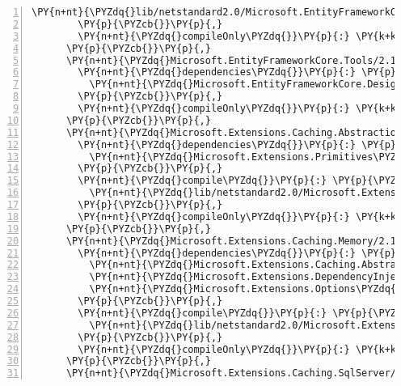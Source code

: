 \begin{Verbatim}[commandchars=\\\{\},numbers=left,firstnumber=1,stepnumber=1,numberblanklines=0]
          \PY{n+nt}{\PYZdq{}lib/netstandard2.0/Microsoft.EntityFrameworkCore.SqlServer.dll\PYZdq{}}\PY{p}{:} \PY{p}{\PYZob{}}\PY{p}{\PYZcb{}}
        \PY{p}{\PYZcb{}}\PY{p}{,}
        \PY{n+nt}{\PYZdq{}compileOnly\PYZdq{}}\PY{p}{:} \PY{k+kc}{true}
      \PY{p}{\PYZcb{}}\PY{p}{,}
      \PY{n+nt}{\PYZdq{}Microsoft.EntityFrameworkCore.Tools/2.1.0\PYZhy{}rc1\PYZhy{}final\PYZdq{}}\PY{p}{:} \PY{p}{\PYZob{}}
        \PY{n+nt}{\PYZdq{}dependencies\PYZdq{}}\PY{p}{:} \PY{p}{\PYZob{}}
          \PY{n+nt}{\PYZdq{}Microsoft.EntityFrameworkCore.Design\PYZdq{}}\PY{p}{:} \PY{l+s+s2}{\PYZdq{}2.1.0\PYZhy{}rc1\PYZhy{}final\PYZdq{}}
        \PY{p}{\PYZcb{}}\PY{p}{,}
        \PY{n+nt}{\PYZdq{}compileOnly\PYZdq{}}\PY{p}{:} \PY{k+kc}{true}
      \PY{p}{\PYZcb{}}\PY{p}{,}
      \PY{n+nt}{\PYZdq{}Microsoft.Extensions.Caching.Abstractions/2.1.0\PYZhy{}rc1\PYZhy{}final\PYZdq{}}\PY{p}{:} \PY{p}{\PYZob{}}
        \PY{n+nt}{\PYZdq{}dependencies\PYZdq{}}\PY{p}{:} \PY{p}{\PYZob{}}
          \PY{n+nt}{\PYZdq{}Microsoft.Extensions.Primitives\PYZdq{}}\PY{p}{:} \PY{l+s+s2}{\PYZdq{}2.1.0\PYZhy{}rc1\PYZhy{}final\PYZdq{}}
        \PY{p}{\PYZcb{}}\PY{p}{,}
        \PY{n+nt}{\PYZdq{}compile\PYZdq{}}\PY{p}{:} \PY{p}{\PYZob{}}
          \PY{n+nt}{\PYZdq{}lib/netstandard2.0/Microsoft.Extensions.Caching.Abstractions.dll\PYZdq{}}\PY{p}{:} \PY{p}{\PYZob{}}\PY{p}{\PYZcb{}}
        \PY{p}{\PYZcb{}}\PY{p}{,}
        \PY{n+nt}{\PYZdq{}compileOnly\PYZdq{}}\PY{p}{:} \PY{k+kc}{true}
      \PY{p}{\PYZcb{}}\PY{p}{,}
      \PY{n+nt}{\PYZdq{}Microsoft.Extensions.Caching.Memory/2.1.0\PYZhy{}rc1\PYZhy{}final\PYZdq{}}\PY{p}{:} \PY{p}{\PYZob{}}
        \PY{n+nt}{\PYZdq{}dependencies\PYZdq{}}\PY{p}{:} \PY{p}{\PYZob{}}
          \PY{n+nt}{\PYZdq{}Microsoft.Extensions.Caching.Abstractions\PYZdq{}}\PY{p}{:} \PY{l+s+s2}{\PYZdq{}2.1.0\PYZhy{}rc1\PYZhy{}final\PYZdq{}}\PY{p}{,}
          \PY{n+nt}{\PYZdq{}Microsoft.Extensions.DependencyInjection.Abstractions\PYZdq{}}\PY{p}{:} \PY{l+s+s2}{\PYZdq{}2.1.0\PYZhy{}rc1\PYZhy{}final\PYZdq{}}\PY{p}{,}
          \PY{n+nt}{\PYZdq{}Microsoft.Extensions.Options\PYZdq{}}\PY{p}{:} \PY{l+s+s2}{\PYZdq{}2.1.0\PYZhy{}rc1\PYZhy{}final\PYZdq{}}
        \PY{p}{\PYZcb{}}\PY{p}{,}
        \PY{n+nt}{\PYZdq{}compile\PYZdq{}}\PY{p}{:} \PY{p}{\PYZob{}}
          \PY{n+nt}{\PYZdq{}lib/netstandard2.0/Microsoft.Extensions.Caching.Memory.dll\PYZdq{}}\PY{p}{:} \PY{p}{\PYZob{}}\PY{p}{\PYZcb{}}
        \PY{p}{\PYZcb{}}\PY{p}{,}
        \PY{n+nt}{\PYZdq{}compileOnly\PYZdq{}}\PY{p}{:} \PY{k+kc}{true}
      \PY{p}{\PYZcb{}}\PY{p}{,}
      \PY{n+nt}{\PYZdq{}Microsoft.Extensions.Caching.SqlServer/2.1.0\PYZhy{}rc1\PYZhy{}final\PYZdq{}}\PY{p}{:} \PY{p}{\PYZob{}}

\end{Verbatim}
